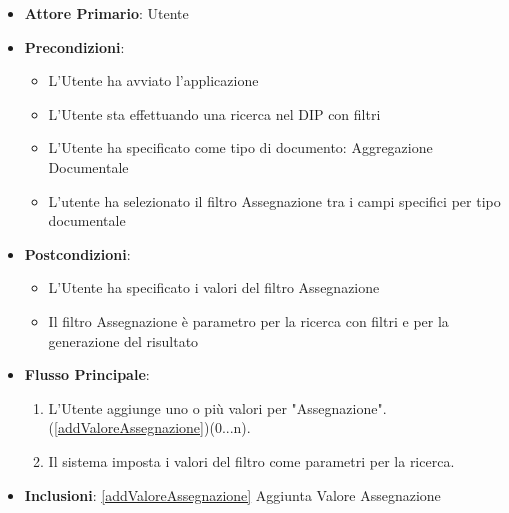 \begin{itemize}
      \item \textbf{Attore Primario}: Utente
      \item \textbf{Precondizioni}: 
      \begin{itemize}
            \item L'Utente ha avviato l'applicazione
            \item L'Utente sta effettuando una ricerca nel DIP con filtri
            \item L'Utente ha specificato come tipo di documento: Aggregazione Documentale
            \item L'utente ha selezionato il filtro Assegnazione tra i campi specifici per tipo documentale
      \end{itemize}
      \item \textbf{Postcondizioni}: 
      \begin{itemize}
            \item L'Utente ha specificato i valori del filtro Assegnazione
            \item Il filtro Assegnazione è parametro per la ricerca con filtri e per la generazione del risultato
      \end{itemize}
      \item \textbf{Flusso Principale}:
      \begin{enumerate}
            \item L'Utente aggiunge uno o più valori per "Assegnazione". (\ref{addValoreAssegnazione})(0...n).
            \item Il sistema imposta i valori del filtro come parametri per la ricerca.
      \end{enumerate}
      \item \textbf{Inclusioni}: \ref{addValoreAssegnazione} Aggiunta Valore Assegnazione
\end{itemize}
      

